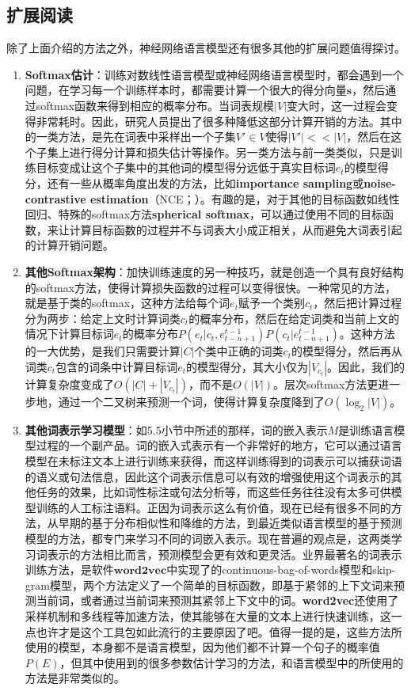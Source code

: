 \documentclass[10pt,a4paper]{ctexart}
\begin{document}
\subsection{扩展阅读}
除了上面介绍的方法之外，神经网络语言模型还有很多其他的扩展问题值得探讨。
\begin{enumerate}
\item[] \textbf{Softmax估计}：训练对数线性语言模型或神经网络语言模型时，都会遇到一个问题，在学习每一个训练样本时，都需要计算一个很大的得分向量$\textbf{s}$，然后通过softmax函数来得到相应的概率分布。当词表规模$|V|$变大时，这一过程会变得非常耗时。因此，研究人员提出了很多种降低这部分计算开销的方法。其中的一类方法，是先在词表中采样出一个子集$V' \in V$使得$|V'| << |V|$，然后在这个子集上进行得分计算和损失估计等操作。另一类方法与前一类类似，只是训练目标变成让这个子集中的其他词的模型得分远低于真实目标词$e_t$的模型得分\cite{collobert2011natural}，还有一些从概率角度出发的方法，比如\textbf{importance sampling}\cite{bengio2008adaptive}或\textbf{noise-contrastive estimation}（NCE；\cite{mnih2012fast}）。有趣的是，对于其他的目标函数如线性回归、特殊的softmax方法\textbf{spherical softmax}，可以通过使用不同的目标函数，来让计算目标函数的过程并不与词表大小成正相关\cite{vincent2015efficient}，从而避免大词表引起的计算开销问题。
\item[] \textbf{其他Softmax架构}：加快训练速度的另一种技巧，就是创造一个具有良好结构的softmax方法，使得计算损失函数的过程可以变得很快。一种常见的方法，就是基于类的softmax\cite{goodman2001classes}，这种方法给每个词$e_t$赋予一个类别$c_t$，然后把计算过程分为两步：给定上文时计算词类$c_t$的概率分布，然后在给定词类和当前上文的情况下计算目标词$e_t$的概率分布$P(e_t|c_t,e_{t-n+1}^{t-1})P(c_t|e_{t-n+1}^{t-1})$。这种方法的一大优势，是我们只需要计算$|C|$个类中正确的词类$c_t$的模型得分，然后再从词类$c_t$包含的词条中计算目标词$e_t$的模型得分，其大小仅为$|V_{c_t}|$。因此，我们的计算复杂度变成了$O(|C| + |V_{c_t}|)$，而不是$O(|V|)$。层次softmax方法\cite{mikolov2013distributed}更进一步地，通过一个二叉树来预测一个词，使得计算复杂度降到了$O(\log_2 |V|)$。
\item[] \textbf{其他词表示学习模型}：如5.5小节中所述的那样，词的嵌入表示$M$是训练语言模型过程的一个副产品。词的嵌入式表示有一个非常好的地方，它可以通过语言模型在未标注文本上进行训练来获得，而这样训练得到的词表示可以捕获词语的语义或句法信息，因此这个词表示信息可以有效的增强使用这个词表示的其他任务的效果，比如词性标注或句法分析等，而这些任务往往没有太多可供模型训练的人工标注语料\cite{turian2010word}。正因为词表示这么有价值，现在已经有很多不同的方法，从早期的基于分布相似性和降维的方法\cite{schutze1993word,turney2010frequency}，到最近类似语言模型的基于预测模型的方法\cite{turian2010word,mikolov2013efficient}，都专门来学习不同的词嵌入表示。现在普遍的观点是，这两类学习词表示的方法相比而言，预测模型会更有效和更灵活\cite{baroni2014don}。业界最著名的词表示训练方法，是软件$\textbf{word2vec}$中实现了的continuous-bag-of-words模型和skip-gram模型，两个方法定义了一个简单的目标函数，即基于紧邻的上下文词来预测当前词，或者通过当前词来预测其紧邻上下文中的词。\textbf{word2vec}还使用了采样机制和多线程等加速方法，使其能够在大量的文本上进行快速训练，这一点也许才是这个工具包如此流行的主要原因了吧。值得一提的是，这些方法所使用的模型，本身都不是语言模型，因为他们都不计算一个句子的概率值$P(E)$，但其中使用到的很多参数估计学习的方法，和语言模型中的所使用的方法是非常类似的。

\end{enumerate}
\end{document}
